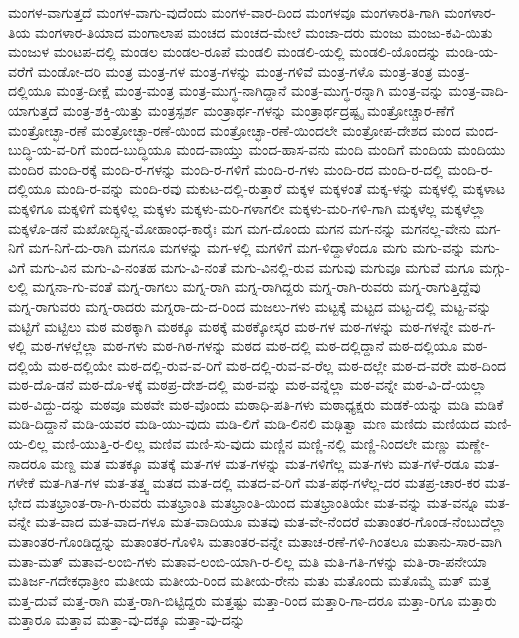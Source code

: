 ಮಂಗಳ-ವಾಗುತ್ತದೆ
ಮಂಗಳ-ವಾಗು-ವುದೆಂದು
ಮಂಗಳ-ವಾರ-ದಿಂದ
ಮಂಗಳವೂ
ಮಂಗಳಾರತಿ-ಗಾಗಿ
ಮಂಗಳಾರ-ತಿಯ
ಮಂಗಳಾರ-ತಿಯಾದ
ಮಂಗಾಲಾಪ
ಮಂಚದ
ಮಂಚದ-ಮೇಲೆ
ಮಂಜಾ-ದರು
ಮಂಜು
ಮಂಜು-ಕವಿ-ಯಿತು
ಮಂಜುಳ
ಮಂಟಪ-ದಲ್ಲಿ
ಮಂಡಲ
ಮಂಡಲ-ರೂಪೆ
ಮಂಡಲಿ
ಮಂಡಲಿ-ಯಲ್ಲಿ
ಮಂಡಲಿ-ಯೊಂದನ್ನು
ಮಂಡಿ-ಯ-ವರೆಗೆ
ಮಂಡೋ-ದರಿ
ಮಂತ್ರ
ಮಂತ್ರ-ಗಳ
ಮಂತ್ರ-ಗಳನ್ನು
ಮಂತ್ರ-ಗಳಿವೆ
ಮಂತ್ರ-ಗಳೊ
ಮಂತ್ರ-ತಂತ್ರ
ಮಂತ್ರ-ದಲ್ಲಿಯೂ
ಮಂತ್ರ-ದೀಕ್ಷೆ
ಮಂತ್ರ-ಮಂತ್ರ
ಮಂತ್ರ-ಮುಗ್ಧ-ನಾಗಿದ್ದಾನೆ
ಮಂತ್ರ-ಮುಗ್ಧ-ರನ್ನಾಗಿ
ಮಂತ್ರ-ವನ್ನು
ಮಂತ್ರ-ವಾದಿ-ಯಾಗುತ್ತದೆ
ಮಂತ್ರ-ಶಕ್ತಿ-ಯಿತ್ತು
ಮಂತ್ರಸ್ಪರ್ಶ
ಮಂತ್ರಾರ್ಥ-ಗಳನ್ನು
ಮಂತ್ರಾರ್ಥದ್ರಷ್ಟೃ
ಮಂತ್ರೋಚ್ಚಾರ-ಣೆಗೆ
ಮಂತ್ರೋಚ್ಛಾ-ರಣೆ
ಮಂತ್ರೋಚ್ಛಾ-ರಣೆ-ಯಿಂದ
ಮಂತ್ರೋಚ್ಛಾ-ರಣೆ-ಯಿಂದಲೇ
ಮಂತ್ರೋಪ-ದೇಶದ
ಮಂದ
ಮಂದ-ಬುದ್ಧಿ-ಯ-ವ-ರಿಗೆ
ಮಂದ-ಬುದ್ಧಿಯೂ
ಮಂದ-ವಾಯ್ತು
ಮಂದ-ಹಾಸ-ವನು
ಮಂದಿ
ಮಂದಿಗೆ
ಮಂದಿಯ
ಮಂದಿಯು
ಮಂದಿರ
ಮಂದಿ-ರಕ್ಕೆ
ಮಂದಿ-ರ-ಗಳನ್ನು
ಮಂದಿ-ರ-ಗಳಿಗೆ
ಮಂದಿ-ರ-ಗಳು
ಮಂದಿ-ರದ
ಮಂದಿ-ರ-ದಲ್ಲಿ
ಮಂದಿ-ರ-ದಲ್ಲಿಯೂ
ಮಂದಿ-ರ-ವನ್ನು
ಮಂದಿ-ರವು
ಮಕುಟ-ದಲ್ಲಿ-ರುತ್ತಾರೆ
ಮಕ್ಕಳ
ಮಕ್ಕಳಂತೆ
ಮಕ್ಕ-ಳನ್ನು
ಮಕ್ಕಳಲ್ಲಿ
ಮಕ್ಕಳಾಟ
ಮಕ್ಕಳಿಗೂ
ಮಕ್ಕಳಿಗೆ
ಮಕ್ಕಳಿಲ್ಲ
ಮಕ್ಕಳು
ಮಕ್ಕಳು-ಮರಿ-ಗಳಾಗಲೀ
ಮಕ್ಕಳು-ಮರಿ-ಗಳಿ-ಗಾಗಿ
ಮಕ್ಕಳೆಲ್ಲ
ಮಕ್ಕಳೆಲ್ಲಾ
ಮಕ್ಕಳೊ-ಡನೆ
ಮಖೋದ್ಭಿನ್ನ-ಮೋಹಾಂಧ-ಕಾರೈಃ
ಮಗ
ಮಗ-ದೊಂದು
ಮಗನ
ಮಗ-ನನ್ನು
ಮಗನಲ್ಲ-ವೇನು
ಮಗ-ನಿಗೆ
ಮಗ-ನಿಗೆ-ದು-ರಾಗಿ
ಮಗನೂ
ಮಗಳನ್ನು
ಮಗ-ಳಲ್ಲಿ
ಮಗಳಿಗೆ
ಮಗ-ಳಿದ್ದಾಳೆಂದೂ
ಮಗು
ಮಗು-ವನ್ನು
ಮಗು-ವಿಗೆ
ಮಗು-ವಿನ
ಮಗು-ವಿ-ನಂತಹ
ಮಗು-ವಿ-ನಂತೆ
ಮಗು-ವಿನಲ್ಲಿ-ರುವ
ಮಗುವು
ಮಗುವೂ
ಮಗುವೆ
ಮಗೂ
ಮಗ್ಗು-ಲಲ್ಲಿ
ಮಗ್ನನಾ-ಗು-ವಂತೆ
ಮಗ್ನ-ರಾಗಲು
ಮಗ್ನ-ರಾಗಿ
ಮಗ್ನ-ರಾಗಿದ್ದರು
ಮಗ್ನ-ರಾಗಿ-ರುವರು
ಮಗ್ನ-ರಾಗುತ್ತಿದ್ದೆವು
ಮಗ್ನ-ರಾಗುವರು
ಮಗ್ನ-ರಾದರು
ಮಗ್ನರಾ-ದು-ದ-ರಿಂದ
ಮಜಲು-ಗಳು
ಮಟ್ಟಕ್ಕೆ
ಮಟ್ಟದ
ಮಟ್ಟ-ದಲ್ಲಿ
ಮಟ್ಟ-ವನ್ನು
ಮಟ್ಟಿಗೆ
ಮಟ್ಟಿಲು
ಮಠ
ಮಠಕ್ಕಾಗಿ
ಮಠಕ್ಕೂ
ಮಠಕ್ಕೆ
ಮಠಕ್ಕೋಸ್ಕರ
ಮಠ-ಗಳ
ಮಠ-ಗಳನ್ನು
ಮಠ-ಗಳನ್ನೇ
ಮಠ-ಗ-ಳಲ್ಲಿ
ಮಠ-ಗಳಲ್ಲೆಲ್ಲಾ
ಮಠ-ಗಳು
ಮಠ-ಗಿಠ-ಗಳನ್ನು
ಮಠದ
ಮಠ-ದಲ್ಲಿ
ಮಠ-ದಲ್ಲಿದ್ದಾನೆ
ಮಠ-ದಲ್ಲಿಯೂ
ಮಠ-ದಲ್ಲಿಯೆ
ಮಠ-ದಲ್ಲಿಯೇ
ಮಠ-ದಲ್ಲಿ-ರುವ-ವ-ರಿಗೆ
ಮಠ-ದಲ್ಲಿ-ರುವ-ವ-ರೆಲ್ಲ
ಮಠ-ದಲ್ಲೇ
ಮಠ-ದ-ವರೇ
ಮಠ-ದಿಂದ
ಮಠ-ದೊ-ಡನೆ
ಮಠ-ದೊ-ಳಕ್ಕೆ
ಮಠಪ್ರ-ದೇಶ-ದಲ್ಲಿ
ಮಠ-ವನ್ನು
ಮಠ-ವನ್ನೆಲ್ಲಾ
ಮಠ-ವನ್ನೇ
ಮಠ-ವಿ-ದೆ-ಯಲ್ಲಾ
ಮಠ-ವಿದ್ದು-ದನ್ನು
ಮಠವೂ
ಮಠವೇ
ಮಠ-ವೊಂದು
ಮಠಾಧಿ-ಪತಿ-ಗಳು
ಮಠಾಧ್ಯಕ್ಷರು
ಮಡಕೆ-ಯನ್ನು
ಮಡಿ
ಮಡಿಕೆ
ಮಡಿ-ದಿದ್ದಾನೆ
ಮಡಿ-ಯವರ
ಮಡಿ-ಯು-ವುದು
ಮಡಿ-ಲಿಗೆ
ಮಡಿ-ಲಿನಲಿ
ಮಢಿತ್ವಾ
ಮಣ
ಮಣಿದು
ಮಣಿಯದ
ಮಣಿ-ಯ-ಲಿಲ್ಲ
ಮಣಿ-ಯುತ್ತಿ-ರ-ಲಿಲ್ಲ
ಮಣಿವ
ಮಣಿ-ಸು-ವುದು
ಮಣ್ಣಿನ
ಮಣ್ಣಿ-ನಲ್ಲಿ
ಮಣ್ಣಿ-ನಿಂದಲೇ
ಮಣ್ಣು
ಮಣ್ಣೇ-ನಾದರೂ
ಮಣ್ದ
ಮತ
ಮತಕ್ಕೂ
ಮತಕ್ಕೆ
ಮತ-ಗಳ
ಮತ-ಗಳನ್ನು
ಮತ-ಗಳಿಗೆಲ್ಲ
ಮತ-ಗಳು
ಮತ-ಗಳೆ-ರಡೂ
ಮತ-ಗಳೇಕೆ
ಮತ-ಗಿತ-ಗಳ
ಮತ-ತತ್ತ್ವ
ಮತದ
ಮತ-ದಲ್ಲಿ
ಮತದ-ವ-ರಿಗೆ
ಮತ-ಪಥ-ಗಳೆಲ್ಲ-ದರ
ಮತಪ್ರ-ಚಾರ-ಕರ
ಮತ-ಭೇದ
ಮತಭ್ರಾಂತ-ರಾ-ಗಿ-ರುವರು
ಮತಭ್ರಾಂತಿ
ಮತಭ್ರಾಂತಿ-ಯಿಂದ
ಮತಭ್ರಾಂತಿಯೇ
ಮತ-ವನ್ನು
ಮತ-ವನ್ನೂ
ಮತ-ವನ್ನೇ
ಮತ-ವಾದ
ಮತ-ವಾದ-ಗಳೂ
ಮತ-ವಾದಿಯೂ
ಮತವು
ಮತ-ವೇ-ನೆಂದರೆ
ಮತಾಂತರ-ಗೊಂಡ-ನೆಂಬುದೆಲ್ಲಾ
ಮತಾಂತರ-ಗೊಂಡಿದ್ದನ್ನು
ಮತಾಂತರ-ಗೊಳಿಸಿ
ಮತಾಂತರ-ವನ್ನೇ
ಮತಾಚ-ರಣೆ-ಗಳಿ-ಗಿಂತಲೂ
ಮತಾನು-ಸಾರ-ವಾಗಿ
ಮತಾ-ಮತ್
ಮತಾವ-ಲಂಬಿ-ಗಳು
ಮತಾವ-ಲಂಬಿ-ಯಾಗಿ-ರ-ಲಿಲ್ಲ
ಮತಿ
ಮತಿ-ಗತಿ-ಗಳನ್ನು
ಮತಿ-ರಾ-ಪನೇಯಾ
ಮತಿರ್ಜ-ಗದೇಕಧಾತ್ರೀಂ
ಮತೀಯ
ಮತೀಯ-ರಿಂದ
ಮತೀಯ-ರೇನು
ಮತು
ಮತೊಂದು
ಮತೊಮ್ಮೆ
ಮತ್
ಮತ್ತ
ಮತ್ತ-ದುವೆ
ಮತ್ತ-ರಾಗಿ
ಮತ್ತ-ರಾಗಿ-ಬಿಟ್ಟಿದ್ದರು
ಮತ್ತಷ್ಟು
ಮತ್ತಾ-ರಿಂದ
ಮತ್ತಾರಿ-ಗಾ-ದರೂ
ಮತ್ತಾ-ರಿಗೂ
ಮತ್ತಾರು
ಮತ್ತಾರೂ
ಮತ್ತಾವ
ಮತ್ತಾ-ವು-ದಕ್ಕೂ
ಮತ್ತಾ-ವು-ದನ್ನು
